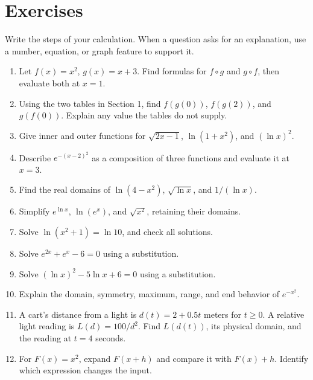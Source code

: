 \documentclass[11pt,letterpaper]{article}
\begin{document}
\newpage
\section*{Exercises}
Write the steps of your calculation. When a question asks for an explanation, use a number, equation, or graph feature to support it.


\begin{enumerate}
\item Let \(f(x)=x^2\), \(g(x)=x+3\). Find formulas for \(f\circ g\) and \(g\circ f\), then evaluate both at \(x=1\).
\item Using the two tables in Section 1, find \(f(g(0))\), \(f(g(2))\), and \(g(f(0))\). Explain any value the tables do not supply.
\item Give inner and outer functions for \(\sqrt{2x-1}\), \(\ln(1+x^2)\), and \((\ln x)^2\).
\item Describe \(e^{-(x-2)^2}\) as a composition of three functions and evaluate it at \(x=3\).
\item Find the real domains of \(\ln(4-x^2)\), \(\sqrt{\ln x}\), and \(1/(\ln x)\).
\item Simplify \(e^{\ln x}\), \(\ln(e^x)\), and \(\sqrt{x^2}\), retaining their domains.
\item Solve \(\ln(x^2+1)=\ln10\), and check all solutions.
\item Solve \(e^{2x}+e^x-6=0\) using a substitution.
\item Solve \((\ln x)^2-5\ln x+6=0\) using a substitution.
\item Explain the domain, symmetry, maximum, range, and end behavior of \(e^{-x^2}\).
\item A cart's distance from a light is \(d(t)=2+0.5t\) meters for \(t\geq0\). A relative light reading is \(L(d)=100/d^2\). Find \(L(d(t))\), its physical domain, and the reading at \(t=4\) seconds.
\item For \(F(x)=x^2\), expand \(F(x+h)\) and compare it with \(F(x)+h\). Identify which expression changes the input.
\end{enumerate}
\end{document}
